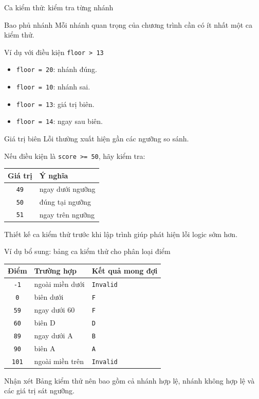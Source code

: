 \documentclass[aspectratio=169,11pt]{beamer}
\newcommand{\code}[1]{\texttt{#1}}
\newcommand{\smallgap}{\vspace{0.4em}}
\begin{document}
\begin{frame}{Ca kiểm thử: kiểm tra từng nhánh}
\begin{block}{Bao phủ nhánh}
Mỗi nhánh quan trọng của chương trình cần có ít nhất một ca kiểm thử.
\end{block}
\begin{exampleblock}{Ví dụ với điều kiện \code{floor > 13}}
\begin{itemize}
  \item \code{floor = 20}: nhánh đúng.
  \item \code{floor = 10}: nhánh sai.
  \item \code{floor = 13}: giá trị biên.
  \item \code{floor = 14}: ngay sau biên.
\end{itemize}
\end{exampleblock}
\end{frame}

\begin{frame}{Giá trị biên}
Lỗi thường xuất hiện gần các ngưỡng so sánh.\smallgap

Nếu điều kiện là \code{score >= 50}, hãy kiểm tra:
\begin{center}
\begin{tabular}{cl}
\toprule
Giá trị & Ý nghĩa \\
\midrule
\code{49} & ngay dưới ngưỡng \\
\code{50} & đúng tại ngưỡng \\
\code{51} & ngay trên ngưỡng \\
\bottomrule
\end{tabular}
\end{center}
\smallgap
Thiết kế ca kiểm thử trước khi lập trình giúp phát hiện lỗi logic sớm hơn.
\end{frame}



\begin{frame}{Ví dụ bổ sung: bảng ca kiểm thử cho phân loại điểm}
\begin{center}
\begin{tabular}{cll}
\toprule
Điểm & Trường hợp & Kết quả mong đợi \\
\midrule
\code{-1} & ngoài miền dưới & \code{Invalid} \\
\code{0} & biên dưới & \code{F} \\
\code{59} & ngay dưới 60 & \code{F} \\
\code{60} & biên D & \code{D} \\
\code{89} & ngay dưới A & \code{B} \\
\code{90} & biên A & \code{A} \\
\code{101} & ngoài miền trên & \code{Invalid} \\
\bottomrule
\end{tabular}
\end{center}
\begin{block}{Nhận xét}
Bảng kiểm thử nên bao gồm cả nhánh hợp lệ, nhánh không hợp lệ và các giá trị sát ngưỡng.
\end{block}
\end{frame}
\end{document}
